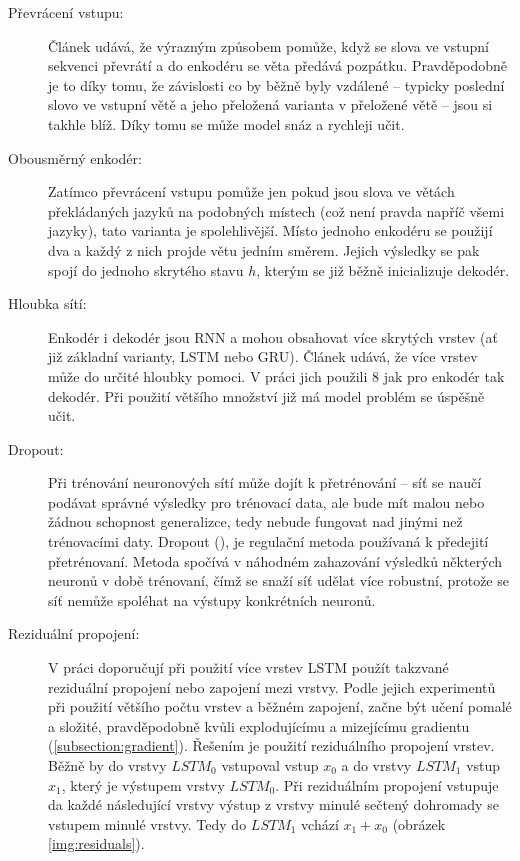 \begin{description}
  \item[Převrácení vstupu:] \label{desc:revert} Článek \cite{seq2seq} udává, že výrazným způsobem pomůže, když se slova ve vstupní sekvenci převrátí a do enkodéru  se věta předává pozpátku. Pravděpodobně je to díky tomu, že závislosti co by běžně byly vzdálené -- typicky poslední slovo ve vstupní větě a jeho přeložená varianta v přeložené větě -- jsou si takhle blíž. Díky tomu se může model snáz a rychleji učit.
  \item[Obousměrný enkodér:] \label{desc:biriectional} Zatímco převrácení vstupu pomůže jen pokud jsou slova ve větách překládaných jazyků na podobných místech (což není pravda napříč všemi jazyky), tato varianta je spolehlivější. Místo jednoho enkodéru se použijí dva a každý z nich projde větu jedním směrem. Jejich výsledky se pak spojí do jednoho skrytého stavu $h$, kterým se již běžně inicializuje dekodér.
  \item[Hloubka sítí:] Enkodér i dekodér jsou RNN a mohou obsahovat více skrytých vrstev (ať již základní varianty, LSTM nebo GRU). Článek \cite{googleBridgingGap} udává, že více vrstev může do určité hloubky pomoci. V práci jich použili 8 jak pro enkodér tak dekodér. Při použití většího množství již má model problém se úspěšně učit.
  \item[Dropout:] \label{desc:dropout} Při trénování neuronových sítí může dojít k přetrénování -- síť se naučí podávat správné výsledky pro trénovací data, ale bude mít malou nebo žádnou schopnost generalizce, tedy nebude fungovat nad jinými než trénovacími daty. Dropout (\cite{dropout}), je regulační metoda používaná k předejití přetrénovaní. Metoda spočívá v náhodném zahazování výsledků některých neuronů v době trénovaní, čímž se snaží síť udělat více robustní, protože se síť nemůže spoléhat na výstupy konkrétních neuronů.
  \item[Reziduální propojení:] V práci \cite{googleBridgingGap} doporučují při použití více vrstev LSTM použít takzvané reziduální propojení nebo zapojení mezi vrstvy. Podle jejich experimentů při použití většího počtu vrstev a běžném zapojení, začne být učení pomalé a složité, pravděpodobně kvůli explodujícímu a mizejícímu gradientu (\ref{subsection:gradient}). Řešením je použití reziduálního propojení vrstev. Běžně by do vrstvy $LSTM_0$ vstupoval vstup $x_0$ a do vrstvy $LSTM_1$ vstup $x_1$, který je výstupem vrstvy $LSTM_0$. Při reziduálním propojení vstupuje da každé následující vrstvy výstup z vrstvy minulé sečtený dohromady se vstupem minulé vrstvy. Tedy do $LSTM_1$ vchází $x_1+x_0$ (obrázek \ref{img:residuals}).

\end{description}

